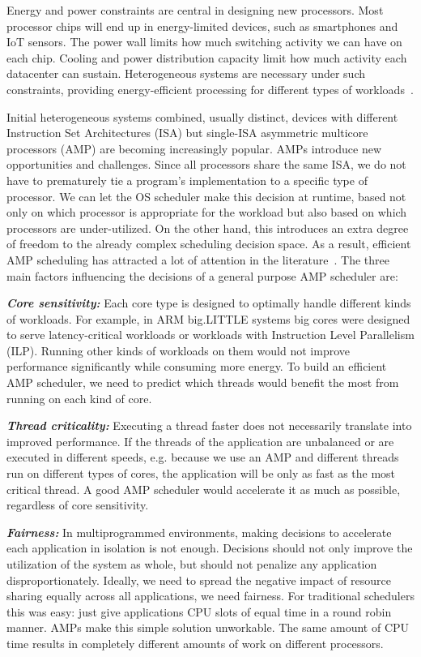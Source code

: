 Energy and power constraints are central in designing new processors. Most processor chips will end up in energy-limited devices, such as smartphones and IoT sensors. The power wall limits how much switching activity we can have on each chip. Cooling and power distribution capacity limit how much activity each datacenter can sustain. Heterogeneous systems are necessary under such constraints, providing energy-efficient processing for different types of workloads~\cite{seeker2014measuring}. 

Initial heterogeneous systems combined, usually distinct, devices with different Instruction Set Architectures (ISA) but single-ISA asymmetric multicore processors (AMP) are becoming increasingly popular. AMPs introduce new opportunities and challenges. Since all processors share the same ISA, we do not have to prematurely tie a program's implementation to a specific type of processor. We can let the OS scheduler make this decision at runtime, based not only on which processor is appropriate for the workload but also based on which processors are under-utilized. On the other hand, this introduces an extra degree of freedom to the already complex scheduling decision space. As a result, efficient AMP scheduling has attracted a lot of attention in the literature~\cite{mittal2016survey}. The three main factors influencing the decisions of a general purpose AMP scheduler are: 

\textbf{\textit{Core sensitivity:}} Each core type is designed to optimally handle different kinds of workloads. For example, in ARM big.LITTLE systems big cores were designed to serve latency-critical workloads or workloads with Instruction Level Parallelism (ILP). Running other kinds of workloads on them would not improve performance significantly while consuming more energy. To build an efficient AMP scheduler, we need to predict which threads would benefit the most from running on each kind of core.
 
\textbf{\textit{Thread criticality:}} Executing a thread faster does not necessarily translate into improved performance. If the threads of the application are unbalanced or are executed in different speeds, e.g. because we use an AMP and different threads run on different types of cores, the application will be only as fast as the most critical thread. A good AMP scheduler would accelerate it as much as possible, regardless of core sensitivity. 
 
\textbf{\textit{Fairness:}} In multiprogrammed environments, making decisions to accelerate each application in isolation is not enough. Decisions should not only improve the utilization of the system as whole, but should not penalize any application disproportionately. Ideally, we need to spread the negative impact of resource sharing equally across all applications, we need fairness. For traditional schedulers this was easy: just give applications CPU slots of equal time in a round robin manner. AMPs make this simple solution unworkable. The same amount of CPU time results in completely different amounts of work on different processors.

